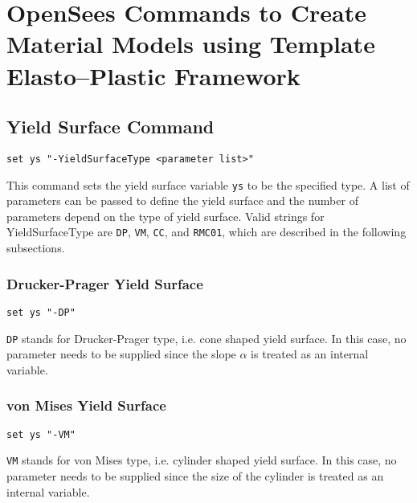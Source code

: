 \section{OpenSees Commands to Create Material Models using Template Elasto--Plastic Framework}
\label{EPTemplate_commands}




\subsection{Yield Surface Command}
\label{YS_Command}

\begin{verbatim}
set ys "-YieldSurfaceType <parameter list>"
\end{verbatim}

This  command sets the yield surface variable \texttt{ys} to be
the  specified  type.  A  list  of  parameters can be passed to
define the yield surface and the number of parameters depend on
the  type  of yield surface. Valid strings for YieldSurfaceType
are \texttt{DP}, \texttt{VM}, \texttt{CC}, and \texttt{RMC01},  
which  are described in the following subsections.

\subsubsection{Drucker-Prager Yield Surface} 
\label{dp_ys}
\begin{verbatim}
set ys "-DP"
\end{verbatim}

\texttt{DP}  stands  for  Drucker-Prager type, i.e. cone shaped
yield  surface. In this case, no parameter needs to be supplied
since the slope $\alpha$ is treated as an internal variable.

\subsubsection{von Mises Yield Surface} 
\label{vm_ys}
\begin{verbatim}
set ys "-VM"
\end{verbatim}

\texttt{VM}  stands  for  von  Mises type, i.e. cylinder shaped
yield  surface. In this case, no parameter needs to be supplied
since  the  size  of  the  cylinder  is  treated as an internal
variable.

